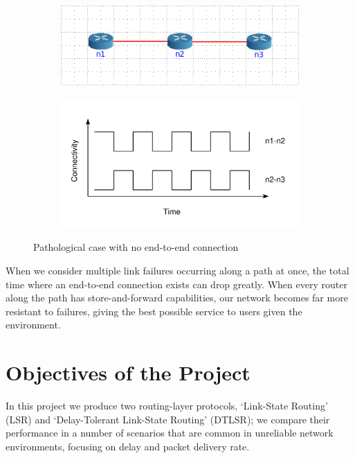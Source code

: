\documentclass[withindex,glossary,openany]{cam-thesis}
\begin{document}
\begin{figure}[H]
\centering
\begin{subfigure}{.45\textwidth}
  \centering
  \includegraphics[width=1\linewidth]{pathalogical_topology}
  \label{fig:pathalogical_topology}
\end{subfigure}%
\begin{subfigure}{.55\textwidth}
  \centering
  \includegraphics[width=1\linewidth]{pathalogical_graph}
  \label{fig:pathalogical_graph}
\end{subfigure}
\caption{Pathological case with no end-to-end connection}
\label{fig:pathalogical}
\end{figure}

When we consider multiple link failures occurring along a path at once, the total time where an end-to-end connection exists can drop greatly. When every router along the path has store-and-forward capabilities, our network becomes far more resistant to failures, giving the best possible service to users given the environment.

\section{Objectives of the Project}

In this project we produce two routing-layer protocols, `Link-State Routing' (LSR) and `Delay-Tolerant Link-State Routing' (DTLSR); we compare their performance in a number of scenarios that are common in unreliable network environments, focusing on delay and packet delivery rate.
\end{document}

